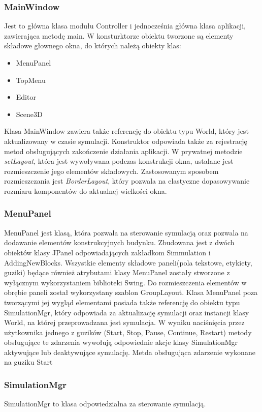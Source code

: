 \subsubsection {MainWindow}
Jest to główna klasa modułu Controller i jednocześnia główna klasa aplikacji, zawierająca metodę main.
 W konsturktorze obiektu tworzone są 
elementy składowe głownego okna, do których należą obiekty klas:
\begin{itemize}
\item {MenuPanel}
\item {TopMenu}
\item {Editor}
\item {Scene3D}
\end{itemize}
Klasa MainWindow zawiera także referencję do obiektu typu World, który jest aktualizowany w czasie symulacji.
Konstruktor odpowiada także za rejestrację metod obsługujących zakończenie działania aplikacji.
W  prywatnej metodzie \textit{setLayout}, która jest wywoływana podczas konstrukcji okna, ustalane jest rozmieszczenie jego elementów składowych. Zastosowanym sposobem rozmieszczania jest \textit{BorderLayout}, który pozwala na elastyczne dopasowywanie rozmiaru komponentów do aktualnej wielkości okna.
\subsubsection{MenuPanel}
MenuPanel jest klasą, która pozwala na sterowanie symulacją oraz pozwala na dodawanie elementów konstrukcyjnych budynku.
Zbudowana jest z dwóch obiektów klasy JPanel odpowiadających zakładkom Simmulation i AddingNewBlocks. Wszystkie elementy składowe paneli(pola tekstowe, etykiety, guziki) będące również atrybutami klasy MenuPanel zostały stworzone z wyłącznym wykorzystaniem biblioteki Swing. Do rozmieszczenia elementów w obrębie paneli został wykorzystany szablon GroupLayout. Klasa MenuPanel poza tworzącymi jej wygląd elementami posiada także referencję do obiektu typu SimulationMgr, który odpowiada za aktualizację symulacji oraz instancji klasy World, na której przeprowadzana jest symulacja. W wyniku naciśnięcia przez użytkownika jednego z guzików (Start, Stop, Pause, Continue, Restart) metody obsługujące te zdarzenia wywołują odpowiednie akcje klasy SimulationMgr aktywujące lub deaktywujące symulację. Metda obsługująca zdarzenie wykonane na guziku Start
\subsubsection{SimulationMgr}
SimulationMgr to klasa odpowiedzialna za sterowanie symulacją.

